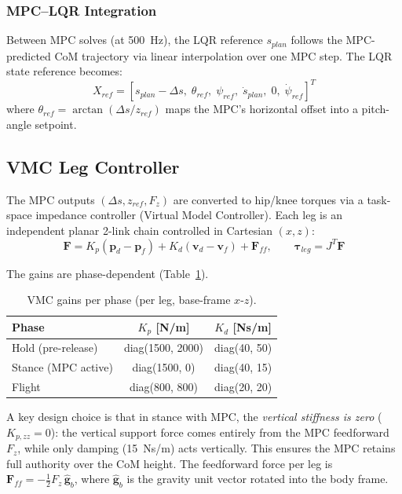 \documentclass[11pt,a4paper]{article}
\newcommand{\btau}{\bm{\tau}}
\begin{document}
\subsubsection{MPC--LQR Integration}

Between MPC solves (at 500~Hz), the LQR reference $s_{plan}$ follows the MPC-predicted CoM
trajectory via linear interpolation over one MPC step.  The LQR state reference becomes:
\begin{equation}
    X_{ref} = [s_{plan} - \Delta s,\;\theta_{ref},\;\psi_{ref},\;
    \dot{s}_{plan},\;0,\;\dot\psi_{ref}]^T
\end{equation}
where $\theta_{ref} = \arctan(\Delta s / z_{ref})$ maps the MPC's horizontal offset into a
pitch-angle setpoint.

\subsection{VMC Leg Controller}

The MPC outputs $(\Delta s, z_{ref}, F_z)$ are converted to hip/knee torques via a
task-space impedance controller (Virtual Model Controller).  Each leg is an independent
planar 2-link chain controlled in Cartesian $(x,z)$:
\begin{equation}
    \bm{F} = K_p(\bm{p}_d - \bm{p}_f) + K_d(\bm{v}_d - \bm{v}_f) + \bm{F}_{ff},
    \qquad \btau_{leg} = J^T\bm{F}
\end{equation}

The gains are phase-dependent (Table~\ref{tab:vmc_gains}).

\begin{table}[H]
    \centering
    \caption{VMC gains per phase (per leg, base-frame $x$-$z$).}
    \label{tab:vmc_gains}
    \begin{tabular}{lcc}
        \toprule
        Phase & $K_p$ [N/m] & $K_d$ [Ns/m] \\
        \midrule
        Hold (pre-release) & diag(1500, 2000) & diag(40, 50) \\
        Stance (MPC active) & diag(1500, 0) & diag(40, 15) \\
        Flight & diag(800, 800) & diag(20, 20) \\
        \bottomrule
    \end{tabular}
\end{table}

A key design choice is that in stance with MPC, the \emph{vertical stiffness is zero}
($K_{p,zz} = 0$): the vertical support force comes entirely from the MPC feedforward
$F_z$, while only damping (15~Ns/m) acts vertically.  This ensures the MPC retains full
authority over the CoM height.  The feedforward force per leg is
$\bm{F}_{ff} = -\tfrac{1}{2}F_z\,\hat{\bm{g}}_b$, where $\hat{\bm{g}}_b$ is the gravity
unit vector rotated into the body frame.
\end{document}
